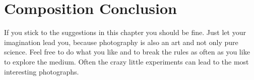 \section{Composition Conclusion}

If you stick to the suggestions in this chapter you should be fine. Just let your imagination lead you, because photography is also an art and not only pure science. Feel free to do what you like and to break the rules as often as you like to explore the medium. Often the crazy little experiments can lead to the most interesting photographs.
